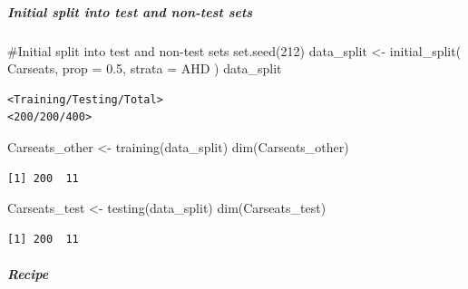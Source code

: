 \documentclass[
]{article}
\let\oldsubparagraph\subparagraph
\renewcommand{\subparagraph}[1]{\oldsubparagraph{#1}\mbox{}}
\newenvironment{Shaded}{\begin{snugshade}}{\end{snugshade}}
\newcommand{\AttributeTok}[1]{\textcolor[rgb]{0.40,0.45,0.13}{#1}}
\newcommand{\CommentTok}[1]{\textcolor[rgb]{0.37,0.37,0.37}{#1}}
\newcommand{\DecValTok}[1]{\textcolor[rgb]{0.68,0.00,0.00}{#1}}
\newcommand{\FloatTok}[1]{\textcolor[rgb]{0.68,0.00,0.00}{#1}}
\newcommand{\FunctionTok}[1]{\textcolor[rgb]{0.28,0.35,0.67}{#1}}
\newcommand{\NormalTok}[1]{\textcolor[rgb]{0.00,0.23,0.31}{#1}}
\newcommand{\OtherTok}[1]{\textcolor[rgb]{0.00,0.23,0.31}{#1}}
\begin{document}
\hypertarget{initial-split-into-test-and-non-test-sets-1}{%
\subparagraph{Initial split into test and non-test
sets}\label{initial-split-into-test-and-non-test-sets-1}}

\begin{Shaded}
\begin{Highlighting}[]
\CommentTok{\#Initial split into test and non{-}test sets}
\FunctionTok{set.seed}\NormalTok{(}\DecValTok{212}\NormalTok{)}
\NormalTok{data\_split }\OtherTok{\textless{}{-}} \FunctionTok{initial\_split}\NormalTok{(}
\NormalTok{  Carseats, }
  \AttributeTok{prop =} \FloatTok{0.5}\NormalTok{,}
  \AttributeTok{strata =}\NormalTok{ AHD}
\NormalTok{  )}
\NormalTok{data\_split}
\end{Highlighting}
\end{Shaded}

\begin{verbatim}
<Training/Testing/Total>
<200/200/400>
\end{verbatim}

\begin{Shaded}
\begin{Highlighting}[]
\NormalTok{Carseats\_other }\OtherTok{\textless{}{-}} \FunctionTok{training}\NormalTok{(data\_split)}
\FunctionTok{dim}\NormalTok{(Carseats\_other)}
\end{Highlighting}
\end{Shaded}

\begin{verbatim}
[1] 200  11
\end{verbatim}

\begin{Shaded}
\begin{Highlighting}[]
\NormalTok{Carseats\_test }\OtherTok{\textless{}{-}} \FunctionTok{testing}\NormalTok{(data\_split)}
\FunctionTok{dim}\NormalTok{(Carseats\_test)}
\end{Highlighting}
\end{Shaded}

\begin{verbatim}
[1] 200  11
\end{verbatim}

\hypertarget{recipe}{%
\subparagraph{Recipe}\label{recipe}}
\end{document}
